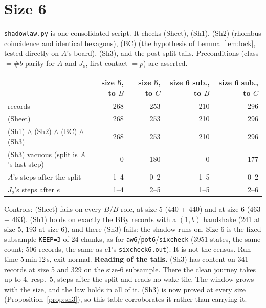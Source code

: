 \documentclass[11pt]{article}
\theoremstyle{definition}\newtheorem{definition}[theorem]{Definition}\newtheorem{remark}[theorem]{Remark}
\begin{document}
\section{Size 6}\label{sec:six}
\texttt{shadowlaw.py} is one consolidated script. It checks (Sheet), (Sh1), (Sh2) (rhombus coincidence and identical hexagons), (BC) (the hypothesis of Lemma~\ref{lem:lock}, tested directly on $A$'s board), (Sh3), and the post-split tails. Preconditions (class $=\#b$ parity for $A$ and $J_o$, first contact $=p$) are asserted.
\begin{center}\begin{tabular}{lrrrr}\toprule
 & size 5, to $B$ & size 5, to $C$ & size 6 sub., to $B$ & size 6 sub., to $C$\\\midrule
records & 268 & 253 & 210 & 296\\
(Sheet) & 268 & 253 & 210 & 296\\
(Sh1) $\wedge$ (Sh2) $\wedge$ (BC) $\wedge$ (Sh3) & 268 & 253 & 210 & 296\\
(Sh3) vacuous (split is $A$'s last step) & 0 & 180 & 0 & 177\\
$A$'s steps after the split & 1--4 & 0--2 & 1--5 & 0--2\\
$J_o$'s steps after $e$ & 1--4 & 2--5 & 1--5 & 2--6\\\bottomrule
\end{tabular}\end{center}
Controls: (Sheet) fails on every $B/B$ role, at size 5 (440 + 440) and at size 6 (463 + 463). (Sh1) holds on exactly the BBy records with a $(1,b)$ handshake (241 at size 5, 193 at size 6), and there (Sh3) fails: the shadow runs on.
Size 6 is the fixed subsample \texttt{KEEP=3} of 24 chunks, as for \texttt{aw6}/\texttt{pot6}/\texttt{sixcheck} (3951 states, the same count; 506 records, the same as c1's \texttt{sixcheck6.out}). It is not the census. Run time 5\,min\,12\,s, exit normal.
\textbf{Reading of the tails.} (Sh3) has content on 341 records at size 5 and 329 on the size-6 subsample. There the clean journey takes up to 4, resp.\ 5, steps after the split and reads no wake tile. The window grows with the size, and the law holds in all of it. (Sh3) is now proved at every size (Proposition~\ref{prop:sh3}), so this table corroborates it rather than carrying it.
\end{document}
